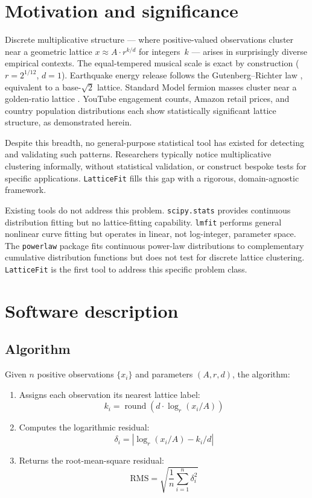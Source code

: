 \documentclass[preprint,12pt]{elsarticle}
\begin{document}
\section{Motivation and significance}

Discrete multiplicative structure --- where positive-valued
observations cluster near a geometric lattice
$x \approx A \cdot r^{k/d}$ for integers~$k$ --- arises in
surprisingly diverse empirical contexts. The equal-tempered musical
scale is exact by construction ($r = 2^{1/12}$, $d = 1$). Earthquake
energy release follows the Gutenberg--Richter law
\cite{GutenbergRichter1944}, equivalent to a base-$\sqrt{2}$
lattice. Standard Model fermion masses cluster near a golden-ratio
lattice \cite{Gentry2026masses}. YouTube engagement counts, Amazon
retail prices, and country population distributions each show
statistically significant lattice structure, as demonstrated herein.

Despite this breadth, no general-purpose statistical tool has existed
for detecting and validating such patterns. Researchers typically
notice multiplicative clustering informally, without statistical
validation, or construct bespoke tests for specific applications.
\texttt{LatticeFit} fills this gap with a rigorous, domain-agnostic
framework.

Existing tools do not address this problem. \texttt{scipy.stats}
\cite{scipy} provides continuous distribution fitting but no
lattice-fitting capability. \texttt{lmfit} \cite{lmfit} performs
general nonlinear curve fitting but operates in linear, not
log-integer, parameter space. The \texttt{powerlaw} package
\cite{powerlaw} fits continuous power-law distributions to
complementary cumulative distribution functions but does not test
for discrete lattice clustering. \texttt{LatticeFit} is the first
tool to address this specific problem class.

\section{Software description}

\subsection{Algorithm}

Given $n$ positive observations $\{x_i\}$ and parameters
$(A, r, d)$, the algorithm:
\begin{enumerate}
\item Assigns each observation its nearest lattice label:
\[
  k_i = \operatorname{round}\!\left(d \cdot \log_r(x_i / A)\right)
\]
\item Computes the logarithmic residual:
\[
  \delta_i = \left|\log_r(x_i / A) - k_i / d\right|
\]
\item Returns the root-mean-square residual:
\[
  \text{RMS} = \sqrt{\frac{1}{n} \sum_{i=1}^n \delta_i^2}
\]
\end{enumerate}
\end{document}
